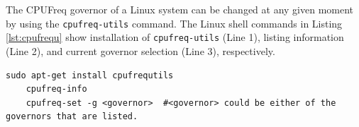 The CPUFreq governor of a Linux system can be changed at any given moment by using the \texttt{cpufreq-utils} command. The Linux shell commands in Listing \ref{lst:cpufrequ} show installation of \texttt{cpufreq-utils} (Line 1), listing information (Line 2), and current governor selection (Line 3), respectively.
\begin{lstlisting}[caption={Changing CPU governer from Linux shell},label={lst:cpufrequ},style=bash]
	sudo apt-get install cpufrequtils
	cpufreq-info
	cpufreq-set -g <governor>  #<governor> could be either of the governors that are listed.
\end{lstlisting}


